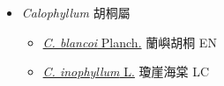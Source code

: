 
  \begin{itemize}
 \item[] \textit{Calophyllum} 胡桐屬
                                
  \begin{itemize}
        \item[] \href{http://www.theplantlist.org/tpl1.1/search?q=Calophyllum+blancoi}{\textit{C. blancoi} Planch.}   蘭嶼胡桐   EN
        \item[] \href{http://www.theplantlist.org/tpl1.1/search?q=Calophyllum+inophyllum}{\textit{C. inophyllum} L.}   瓊崖海棠   LC
  \end{itemize}
  \end{itemize}
